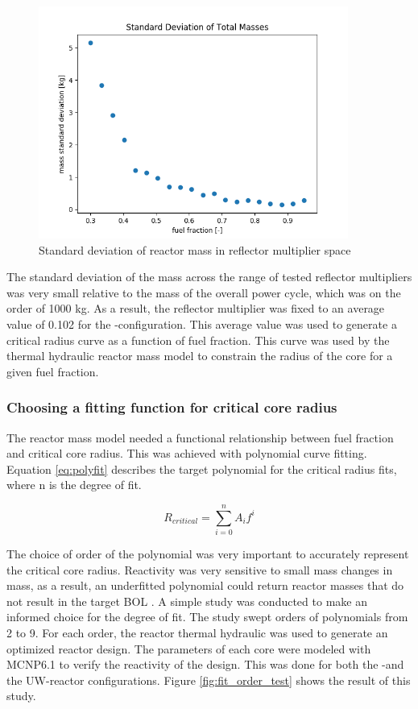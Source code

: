 \begin{figure}[h]
    \centering
    \includegraphics[width=4in]{../images/mass_std_uo2_co2.png}
\caption{Standard deviation of reactor mass in reflector multiplier space}
\label{fig:mass_std_co2_uo2}
\end{figure}

The standard deviation of the mass across the range of tested reflector
multipliers was very small relative to the mass of the overall power cycle,
which was on the order of 1000 kg. As a result, the reflector multiplier was fixed to an
average value of 0.102 for the \uox-\codiox configuration. 
This average value was used to generate a critical radius
curve as a function of fuel fraction. This curve was used by the thermal
hydraulic reactor mass model to constrain the radius of the core for a given
fuel fraction. 


\subsubsection{Choosing a fitting function for critical core radius}
The reactor mass model needed a functional relationship between fuel fraction
and critical core radius. This was achieved with polynomial curve fitting.
Equation \ref{eq:polyfit} describes the target polynomial for the critical
radius fits, where n is the degree of fit.

\begin{equation}
    R_{critical} = \sum_{i=0}^n A_if^i
    \label{eq:polyfit}
\end{equation}

The choice of order of the polynomial was very important to accurately represent the
critical core radius. Reactivity was very sensitive to small mass changes in mass, as
a result, an underfitted polynomial could return reactor masses that do not
result in the target BOL \keff. A simple study was conducted to make an informed
choice for the degree of fit. The study swept orders of polynomials from 2 to 9.
For each order, the reactor thermal hydraulic was used to generate an optimized reactor
design. The parameters of each core were modeled with MCNP6.1 to verify the
reactivity of the design. This was done for both the \uox-\codiox and
the UW-\codiox reactor configurations. Figure \ref{fig:fit_order_test} shows the
result of this study.

